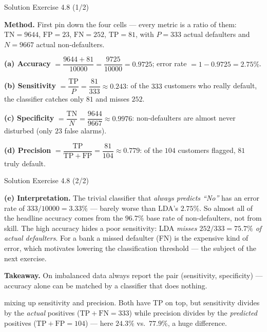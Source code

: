 \documentclass[aspectratio=169,11pt]{beamer}
\begin{document}
\begin{frame}{Solution \textemdash{} Exercise 4.8 (1/2)}
\begin{solutionbox}
\textbf{Method.} First pin down the four cells --- every metric is a
ratio of them:
$\mathrm{TN}=9644$, $\mathrm{FP}=23$, $\mathrm{FN}=252$,
$\mathrm{TP}=81$, with $P=333$ actual defaulters and $N=9667$ actual
non-defaulters.

\vspace{1mm}
\textbf{(a) Accuracy} $=\dfrac{9644+81}{10000}=\dfrac{9725}{10000}
=0.9725$; error rate $=1-0.9725=2.75\%$.

\textbf{(b) Sensitivity} $=\dfrac{\mathrm{TP}}{P}=\dfrac{81}{333}
\approx 0.243$: of the $333$ customers who really default, the
classifier catches only $81$ and misses $252$.

\textbf{(c) Specificity} $=\dfrac{\mathrm{TN}}{N}=\dfrac{9644}{9667}
\approx 0.9976$: non-defaulters are almost never disturbed (only $23$
false alarms).

\textbf{(d) Precision} $=\dfrac{\mathrm{TP}}{\mathrm{TP+FP}}
=\dfrac{81}{104}\approx 0.779$: of the $104$ customers flagged, $81$
truly default.
\end{solutionbox}
\end{frame}

\begin{frame}{Solution \textemdash{} Exercise 4.8 (2/2)}
\begin{solutionbox}
\textbf{(e) Interpretation.}
The trivial classifier that \emph{always predicts ``No''} has an error
rate of $333/10000=3.33\%$ --- barely worse than LDA's $2.75\%$. So
almost all of the headline accuracy comes from the $96.7\%$ base rate
of non-defaulters, not from skill. The
high accuracy hides a poor sensitivity: LDA \emph{misses
$252/333=75.7\%$ of actual defaulters}. For a bank a missed defaulter
(FN) is the expensive kind of error,
which motivates lowering the classification threshold --- the subject
of the next exercise.

\vspace{1mm}
\textbf{Takeaway.} On imbalanced data always report the pair
(sensitivity, specificity) --- accuracy alone can be matched by a
classifier that does nothing.
\end{solutionbox}
\begin{mistake}
mixing up sensitivity and precision. Both have
TP on top, but sensitivity divides by the \emph{actual} positives
($\mathrm{TP+FN}=333$) while precision divides by the \emph{predicted}
positives ($\mathrm{TP+FP}=104$) --- here $24.3\%$ vs.\ $77.9\%$, a
huge difference.
\end{mistake}
\end{frame}
\end{document}

